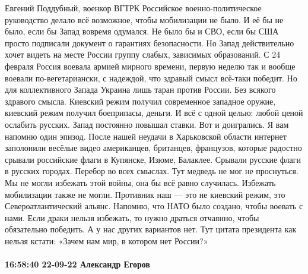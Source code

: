 Евгений Поддубный, военкор ВГТРК
Российское военно-политическое руководство делало всё возможное, чтобы мобилизации не было. И её бы не было, если бы Запад вовремя одумался. Не было бы и СВО, если бы США просто подписали документ о гарантиях безопасности. Но Запад действительно хочет видеть на месте России группу слабых, зависимых образований.
С 24 февраля Россия воевала армией мирного времени, первую неделю так и вообще воевали по-вегетариански, с надеждой, что здравый смысл всё-таки победит. Но для коллективного Запада Украина лишь таран против России. Без всякого здравого смысла. Киевский режим получил современное западное оружие, киевский режим получил боеприпасы, деньги. И всё с одной целью: любой ценой ослабить русских.
Запад постоянно повышал ставки. Вот и доигрались. Я вам напомню один эпизод. После нашей неудачи в Харьковской области интернет заполонили весёлые видео американцев, британцев, французов, которые радостно срывали российские флаги в Купянске, Изюме, Балаклее. Срывали русские флаги в русских городах. Перебор во всех смыслах. Тут медведь не мог не проснуться.
Мы не могли избежать этой войны, она бы всё равно случилась. Избежать мобилизации также не могли. Противник наш — это не киевский режим, это Североатлантический альянс. Напомню, что НАТО было создано, чтобы воевать с нами.
Если драки нельзя избежать, то нужно драться отчаянно, чтобы обязательно победить. А у нас других вариантов нет. Тут цитата президента как нельзя кстати: «Зачем нам мир, в котором нет России?»


\paragraph{16:58:40 22-09-22 Александр Егоров}

